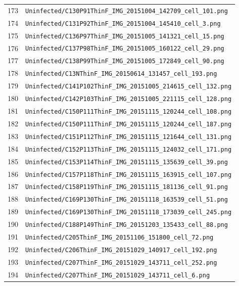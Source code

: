 \begin{longtable}{r p{12cm}}
173 & \texttt{Uninfected/C130P91ThinF\_IMG\_20151004\_142709\_cell\_101.png} \\
174 & \texttt{Uninfected/C131P92ThinF\_IMG\_20151004\_145410\_cell\_3.png} \\
175 & \texttt{Uninfected/C136P97ThinF\_IMG\_20151005\_141321\_cell\_15.png} \\
176 & \texttt{Uninfected/C137P98ThinF\_IMG\_20151005\_160122\_cell\_29.png} \\
177 & \texttt{Uninfected/C138P99ThinF\_IMG\_20151005\_172849\_cell\_90.png} \\
178 & \texttt{Uninfected/C13NThinF\_IMG\_20150614\_131457\_cell\_193.png} \\
179 & \texttt{Uninfected/C141P102ThinF\_IMG\_20151005\_214615\_cell\_132.png} \\
180 & \texttt{Uninfected/C142P103ThinF\_IMG\_20151005\_221115\_cell\_128.png} \\
181 & \texttt{Uninfected/C150P111ThinF\_IMG\_20151115\_120244\_cell\_108.png} \\
182 & \texttt{Uninfected/C150P111ThinF\_IMG\_20151115\_120244\_cell\_187.png} \\
183 & \texttt{Uninfected/C151P112ThinF\_IMG\_20151115\_121644\_cell\_131.png} \\
184 & \texttt{Uninfected/C152P113ThinF\_IMG\_20151115\_124032\_cell\_171.png} \\
185 & \texttt{Uninfected/C153P114ThinF\_IMG\_20151115\_135639\_cell\_39.png} \\
186 & \texttt{Uninfected/C157P118ThinF\_IMG\_20151115\_163915\_cell\_107.png} \\
187 & \texttt{Uninfected/C158P119ThinF\_IMG\_20151115\_181136\_cell\_91.png} \\
188 & \texttt{Uninfected/C169P130ThinF\_IMG\_20151118\_163539\_cell\_51.png} \\
189 & \texttt{Uninfected/C169P130ThinF\_IMG\_20151118\_173039\_cell\_245.png} \\
190 & \texttt{Uninfected/C188P149ThinF\_IMG\_20151203\_135433\_cell\_88.png} \\
191 & \texttt{Uninfected/C205ThinF\_IMG\_20151106\_151800\_cell\_72.png} \\
192 & \texttt{Uninfected/C206ThinF\_IMG\_20151029\_140917\_cell\_192.png} \\
193 & \texttt{Uninfected/C207ThinF\_IMG\_20151029\_143711\_cell\_252.png} \\
194 & \texttt{Uninfected/C207ThinF\_IMG\_20151029\_143711\_cell\_6.png} \\

\end{longtable}
